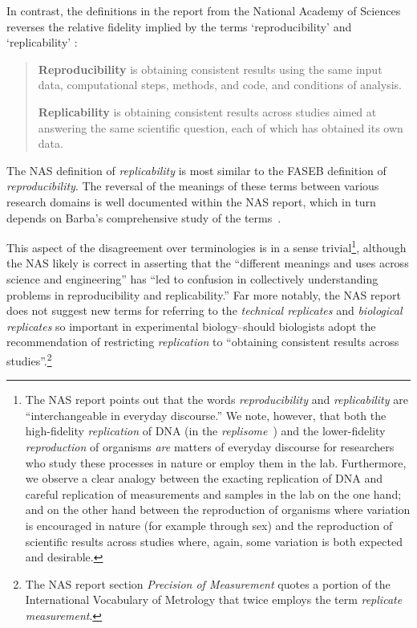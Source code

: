 In contrast, the definitions in the report from the National Academy of Sciences reverses the relative
	 fidelity implied by the terms `reproducibility' and `replicability' \cite[p.4]{committeeonreproducibilityandreplicabilityinscience2019reproducibility}:
\begin{quote}
	\textbf{Reproducibility} is obtaining consistent results using the same input data, computational
	steps, methods, and code, and conditions of analysis.  \medskip

	\textbf{Replicability} is obtaining consistent results across studies aimed at answering the same
	scientific question, each of which has obtained its own data.
\end{quote}

The NAS definition of \emph{replicability} is most similar to the FASEB definition of \emph{reproducibility}.
The reversal of the meanings of these terms between various research domains is well documented within the NAS report,
	which in turn depends on Barba's comprehensive study of the terms~\cite{barba2018terminologies}.

This aspect of the disagreement over terminologies is in a sense trivial\footnote{
	The NAS report points out that the words \emph{reproducibility} and \emph{replicability} are
		``interchangeable in everyday discourse.''
	We note, however, that both the high-fidelity \emph{replication} of DNA (in the \emph{replisome}~\cite{spenkelink_recycling_2019})
		and the lower-fidelity \emph{reproduction}
		of organisms \emph{are} matters of everyday discourse for researchers who study these processes in nature or employ them in the lab.
	Furthermore, we observe a clear analogy between the exacting replication of DNA and careful replication of measurements and samples
		in the lab on the one hand; and on the other hand between the reproduction of organisms where variation is encouraged in nature
		(for example through sex) and the reproduction of scientific results across studies where, again, some variation is both
		expected and desirable.
    }, although the NAS likely is correct in
	asserting that the ``different meanings and uses across science and engineering'' has ``led to confusion in collectively
	understanding problems in reproducibility and replicability.''
Far more notably, the NAS report does not suggest new terms for referring to the \emph{technical replicates}
	and  \emph{biological replicates} so important in experimental biology--should biologists adopt the recommendation
	of restricting \emph{replication} to ``obtaining consistent results across studies''.\footnote{
		The NAS report section \emph{Precision of Measurement} quotes a portion of the International Vocabulary of
		Metrology that twice employs the term \emph{replicate measurement}.
	}

